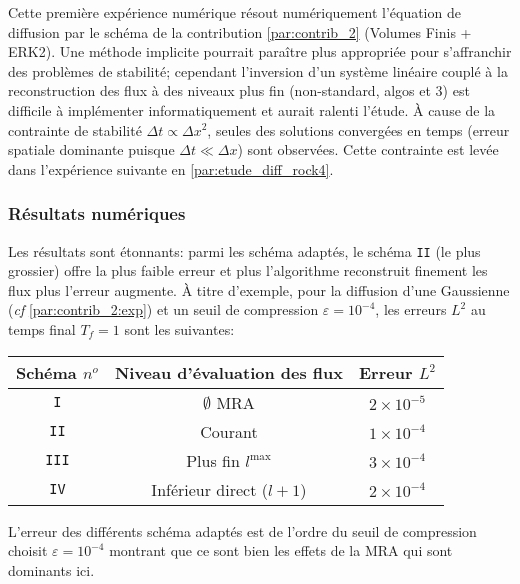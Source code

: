 Cette première expérience numérique résout numériquement l'équation de diffusion par le schéma de la contribution \ref{par:contrib_2} (Volumes Finis + ERK2).
Une méthode implicite pourrait paraître plus appropriée pour s'affranchir des problèmes de stabilité; cependant l'inversion d'un système linéaire couplé à 
la reconstruction des flux à des niveaux plus fin (non-standard, algos \texttt{} et 3) est difficile à implémenter informatiquement et aurait ralenti l'étude.
À cause de la contrainte de stabilité $\Delta t \propto \Delta x^2$,
seules des solutions convergées en temps (erreur spatiale dominante puisque $\Delta t \ll \Delta x$) sont observées. Cette contrainte est levée dans l'expérience suivante en \ref{par:etude_diff_rock4}.\par 
\subsubsection{Résultats numériques}
Les résultats sont étonnants: parmi les schéma adaptés, le schéma \texttt{II} (le plus grossier) offre la plus faible erreur et plus l'algorithme reconstruit finement les flux plus l'erreur augmente. 
À titre d'exemple, pour la diffusion d'une Gaussienne (\textit{cf} \ref{par:contrib_2:exp}) et un seuil de compression $\varepsilon = 10^{-4}$, les erreurs $L^2$ au temps final $T_f=1$ sont les suivantes:\par
\begin{center}\begin{tabular}{|c|c|c|}
\hline
Schéma $n^o$ & Niveau d'évaluation des flux & Erreur $L^2$ \\
\hline
\texttt{I} & $\emptyset$ MRA & $2 \times 10^{-5}$ \\
\texttt{II} & Courant & $1 \times 10^{-4}$ \\
\texttt{III} & Plus fin $l^{\max}$& $3 \times 10^{-4}$ \\
\texttt{IV} & Inférieur direct ($l+1$) & $2 \times 10^{-4}$ \\


\hline
\end{tabular}\end{center}
L'erreur des différents schéma adaptés est de l'ordre du seuil de compression choisit $\varepsilon = 10^{-4}$ montrant que ce sont bien
les effets de la MRA qui sont dominants ici.

